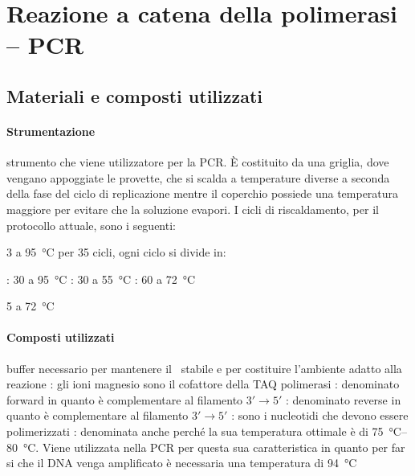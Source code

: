 \section{Reazione a catena della polimerasi -- PCR}

\subsection{Materiali e composti utilizzati}
\paragraph{Strumentazione}
\begin{itemize}[person]
	\itemb[Termociclatore:] strumento che viene utilizzatore per la PCR. È costituito da una griglia, dove vengano appoggiate le provette, che si scalda a temperature diverse a seconda della fase del ciclo di replicazione mentre il coperchio possiede una temperatura maggiore per evitare che la soluzione evapori.
	I cicli di riscaldamento, per il protocollo attuale, sono i seguenti:
	\begin{itemize}[squareItem]
		 \qty{3}{\min} a \qty{95}{\celsius}
		\itemb[Amplificazione] per 35 cicli, ogni ciclo si divide in:
		\begin{itemize}[squareItem]
			\itemb[Denaturazione]: \qty{30}{\sec} a \qty{95}{\celsius}
			\itemb[Ibridazione]: \qty{30}{\sec} a \qty{55}{\celsius}
			\itemb[Estensione]: \qty{60}{\sec} a \qty{72}{\celsius}
		\end{itemize}
		 \qty{5}{\min} a \qty{72}{\celsius}
	\end{itemize}
\end{itemize}

\paragraph{Composti utilizzati}
\begin{itemize}
	 buffer necessario per mantenere il \pH\ stabile e per costituire l'ambiente adatto alla reazione
	\itemb[\ch{MgCl2}]: gli ioni magnesio  sono il cofattore della TAQ polimerasi
	: denominato \foreignlanguage{english}{forward} in quanto è complementare al filamento \(3' \rightarrow 5'\)
	: denominato \foreignlanguage{english}{reverse} in quanto è complementare al filamento \(3' \rightarrow 5'\)
	\itemb[dNTPs]: sono i nucleotidi che devono essere polimerizzati
	: denominata anche  perché la sua temperatura ottimale è di \qtyrange{75}{80}{\celsius}. Viene utilizzata nella PCR per questa sua caratteristica in quanto per far si che il DNA venga amplificato è necessaria una temperatura di \qty{94}{\celsius}
\end{itemize}


